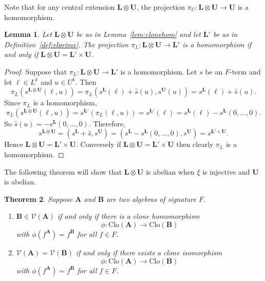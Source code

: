 \documentclass[10pt,a4paper]{amsart}
\numberwithin{equation}{section}
\newtheorem{theorem}{Theorem}[section]
\newtheorem{lemma}[theorem]{Lemma}
\newcommand{\A}{\mathbf{A}}
\newcommand{\B}{\mathbf{B}}
\renewcommand{\L}{\mathbf{L}}
\newcommand{\U}{\mathbf{U}}
\newcommand{\V}{\mathcal{V}}
\newcommand{\Clo}{\mathrm{Clo}}
\begin{document}
Note that  for any central extension $\L \otimes \U$, the projection 
  $\pi_U \colon \L \otimes \U \rightarrow \U$ is a homomorphism.

\begin{lemma} \label{lem:injective} 
  Let $\L \otimes \U$  be as in Lemma~\ref{lem:clonehom} and let $\L'$ be as in Definition~\ref{def:elprime}.
  The projection $\pi_L \colon \L \otimes \U \rightarrow \L'$ is a homomorphism if and only if 
    $\L \otimes \U = \L' \times \U$. 
\end{lemma}

\begin{proof}
  Suppose that $\pi_L \colon \L \otimes \U \rightarrow \L'$ is a homomorphism.
  Let $s$  be an $F$-term and let $\ell \in L^k$ and $u \in U^k$.
  Then 
    \[ \pi_L(s^{\L \otimes \U}(\ell,u))  = \pi_L(s^\L(\ell) + \hat{s}(u), s^\U(u))  = s^\L(\ell) + \hat{s}(u). \]
  Since $\pi_L$ is a homomorphism, 
    \[\pi_L(s^{\L \otimes \U}(\ell,u)) = s^{\L'}(\pi_L(\ell, u)) = s^{\L'}(\ell)= s^\L(\ell) - s^\L(0, \ldots,0).\]
  So $\hat{s}(u) = -s^\L(0, \ldots,0)$.
  Therefore,
    \[ s^{\L \otimes \U} = (s^\L + \hat{s}, s^\U) = (s^\L - s^\L(0, \ldots, 0), s^\U) = s^{\L' \times \U}. \]
  Hence $\L \otimes \U = \L' \times \U$.
  Conversely if $\L \otimes \U = \L' \times \U$ then clearly $\pi_L$ is a homomorphism. 
\end{proof}

The following theorem will show that $\L \otimes \U$ is abelian when $\xi$ is injective and $\U$ is abelian. 

\begin{theorem}\cite[Theorem 9.3]{ALV:III} \label{ALV:clone} 
  Suppose $\A$ and $\B$ are two algebras of signature $F$. 
  \begin{enumerate}
    \item 
      $\B \in \V(\A)$ if and only if there is a clone homomorphism 
        \[\phi \colon \Clo(\A) \rightarrow \Clo(\B)\]
        with $\phi(f^\A) = f^\B$ for all $f \in F$.
    \item 
      $\V(\A) = \V(\B)$ if and only if there exists a clone isomorphism 
        \[\phi \colon \Clo(\A) \rightarrow \Clo(\B)\]
        with  $\phi(f^\A) = f^\B$ for all $f \in F$.
  \end{enumerate}
\end{theorem}
\end{document}
